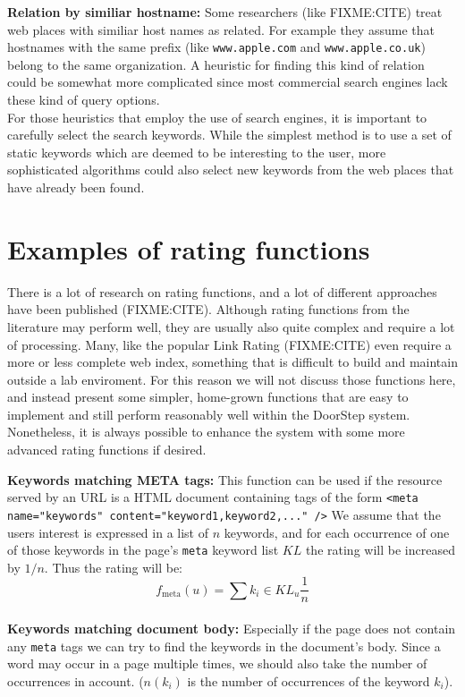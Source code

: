 \documentclass[a4paper]{danarticle}
\theoremstyle{remark}
\begin{document}
    \textbf{Relation by similiar hostname:} Some researchers (like FIXME:CITE) 
    treat web places with similiar host names as related. For example they 
    assume that hostnames with the same prefix (like \verb$www.apple.com$ and
    \verb$www.apple.co.uk$) belong to the same organization. A heuristic for 
    finding this kind of relation could be somewhat more complicated since most 
    commercial search engines lack these kind of query options.
    \\
    
    For those heuristics that employ the use of search engines, it is important 
    to carefully select the search keywords. While the simplest method is to use 
    a set of static keywords which are deemed to be interesting to the user, 
    more sophisticated algorithms could also select new keywords from the web 
    places that have already been found.
  \section{Examples of rating functions}
    There is a lot of research on rating functions, and a lot of different 
    approaches have been published (FIXME:CITE). Although rating functions from 
    the literature may perform well, they are usually also quite complex and 
    require a lot of processing. Many, like the popular Link Rating (FIXME:CITE) 
    even require a more or less complete web index, something that is difficult 
    to build and maintain outside a lab enviroment. For this reason we will not 
    discuss those functions here, and instead present some simpler, home-grown 
    functions that are easy to implement and still perform reasonably well 
    within the DoorStep system. Nonetheless, it is always possible to enhance 
    the system with some more advanced rating functions if desired.
  
    \textbf{Keywords matching META tags:} This function can be used if the
    resource served by an URL is a HTML document containing tags of the form
    \verb$<meta name="keywords" content="keyword1,keyword2,..." />$ 
    We assume that the users interest is expressed in a list of $ n $ keywords,
    and for each occurrence of one of those keywords in the page's \verb$meta$
    keyword list $ KL $ the rating will be increased by $ 1/n $. Thus
    the rating will be:
    \[
      f_{\mbox{meta}}(u) = \sum{k_i \in KL_u} \frac{1}{n}
    \]
    \\
    
    \textbf{Keywords matching document body:} Especially if the page does not
    contain any \verb$meta$ tags we can try to find the keywords in the
    document's body. Since a word may occur in a page multiple times, we should
    also take the number of occurrences in account. ($ n(k_i) $ is the number of
    occurrences of the keyword $ k_i $).
    
\end{document}
